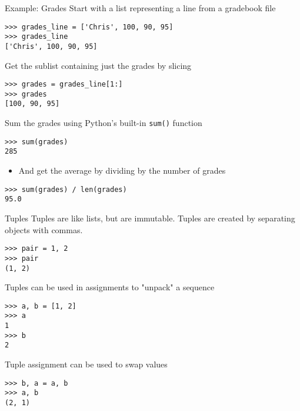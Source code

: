 \documentclass[smaller, aspectratio=1610]{beamer}
\begin{document}
\begin{frame}[label={sec:orgac455b3},fragile]{Example: Grades}
 Start with a list representing a line from a gradebook file

\lstset{language=Python,label= ,caption= ,captionpos=b,numbers=none}
\begin{lstlisting}
>>> grades_line = ['Chris', 100, 90, 95]
>>> grades_line
['Chris', 100, 90, 95]
\end{lstlisting}

Get the sublist containing just the grades by slicing

\lstset{language=Python,label= ,caption= ,captionpos=b,numbers=none}
\begin{lstlisting}
>>> grades = grades_line[1:]
>>> grades
[100, 90, 95]
\end{lstlisting}

Sum the grades using Python's built-in \texttt{sum()} function

\lstset{language=Python,label= ,caption= ,captionpos=b,numbers=none}
\begin{lstlisting}
>>> sum(grades)
285
\end{lstlisting}

\begin{itemize}
\item And get the average by dividing by the number of grades
\end{itemize}

\lstset{language=Python,label= ,caption= ,captionpos=b,numbers=none}
\begin{lstlisting}
>>> sum(grades) / len(grades)
95.0
\end{lstlisting}
\end{frame}

\begin{frame}[label={sec:orgdcf87a6},fragile]{Tuples}
 Tuples are like lists, but are immutable.  Tuples are created by separating objects with commas.

\lstset{language=Python,label= ,caption= ,captionpos=b,numbers=none}
\begin{lstlisting}
>>> pair = 1, 2
>>> pair
(1, 2)
\end{lstlisting}

Tuples can be used in assignments to "unpack" a sequence

\lstset{language=Python,label= ,caption= ,captionpos=b,numbers=none}
\begin{lstlisting}
>>> a, b = [1, 2]
>>> a
1
>>> b
2
\end{lstlisting}

Tuple assignment can be used to swap values

\lstset{language=Python,label= ,caption= ,captionpos=b,numbers=none}
\begin{lstlisting}
>>> b, a = a, b
>>> a, b
(2, 1)
\end{lstlisting}
\end{frame}
\end{document}
